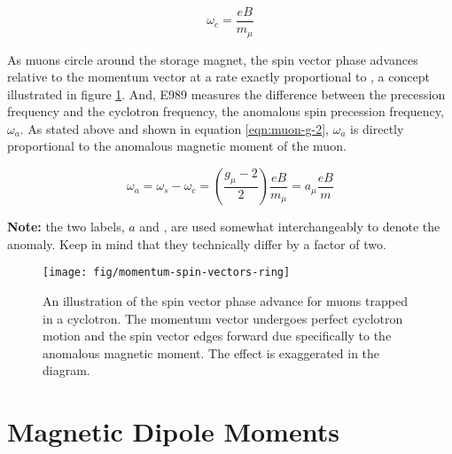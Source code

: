 \begin{equation}
\label{eqn:omega-c}
\omega_c = \frac{e B}{m_\mu}
\end{equation}

\noindent
As muons circle around the storage magnet, the spin vector phase advances relative to the momentum vector at a rate exactly proportional to \gmtwo, a concept illustrated in figure \ref{fig:momentum-spin-vectors-ring}.  And, E989 measures the difference between the precession frequency and the cyclotron frequency, the anomalous spin precession frequency, $\omega_a$.  As stated above and shown in equation \ref{eqn:muon-g-2}, $\omega_a$ is directly proportional to the anomalous magnetic moment of the muon.

\begin{equation}
\label{eqn:muon-g-2}
\omega_a = \omega_s - \omega_c = \left( \frac{g_\mu - 2}{2} \right) \frac{e B}{m_\mu} = a_\mu \frac{e B}{m}
\end{equation}

\noindent
\textbf{Note:} the two labels, $a$ and \gmtwo, are used somewhat interchangeably to denote the anomaly.  Keep in mind that they technically differ by a factor of two.

\begin{figure}
\centering
\texttt{[image: fig/momentum-spin-vectors-ring]}
\caption{
    An illustration of the spin vector phase advance for muons trapped in a cyclotron.  The momentum vector undergoes perfect cyclotron motion and the spin vector edges forward due specifically to the anomalous magnetic moment.  The effect is exaggerated in the diagram. 
    \label{fig:momentum-spin-vectors-ring}
}
\end{figure}


\section{Magnetic Dipole Moments}

